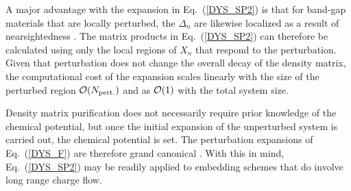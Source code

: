 A major advantage with the expansion in Eq.\ (\ref{DYS_SP2}) is that for band-gap 
materials that are locally perturbed, the $\Delta_n$ are likewise localized as a result 
of nearsightedness \cite{Kohn59,Kohn96}. The matrix products in Eq.\ (\ref{DYS_SP2}) 
can therefore be calculated using only the local regions of $X_n$ that respond to the perturbation.
Given that perturbation does not change the overall decay of the
density matrix, the computational cost of the expansion scales linearly with the
size of the perturbed region ${\cal O}(N_{\rm pert.})$ and as ${\cal O}(1)$ with
the total system size.

Density matrix purification does not necessarily require
prior knowledge of the chemical potential, but once the
initial expansion of the unperturbed system is carried out, the
chemical potential is set. The perturbation expansions of 
Eq.\ (\ref{DYS_F}) are therefore grand canonical \cite{CPRT}.
With this in mind, Eq.~(\ref{DYS_SP2}) may be readily applied 
to embedding schemes that do involve long range charge flow.

